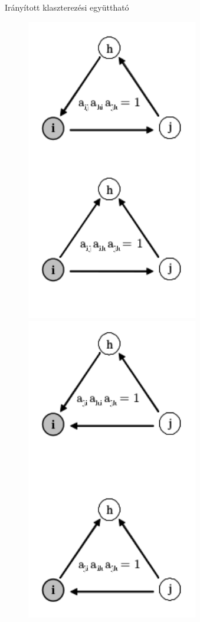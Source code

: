 \documentclass{beamer}
\newlength{\onecolwid}
\begin{document}
\begin{frame}[t]
\begin{columns}[t]
\begin{column}{\onecolwid}
          \begin{block}{Irányított klaszterezési együttható \citep{fagiolo2007clustering}}
            \begin{figure}
              \includegraphics[width=7.5cm]{triangle-directions_1}
              \includegraphics[width=7.5cm]{triangle-directions_2}
            \end{figure}
          \end{block}
    \end{column}


\end{columns}
\end{frame}
\end{document}
